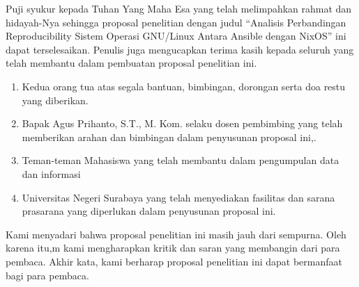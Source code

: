 \begin{justify}
	Puji syukur kepada Tuhan Yang Maha Esa yang telah melimpahkan rahmat dan hidayah-Nya sehingga proposal penelitian dengan judul “Analisis Perbandingan Reproducibility Sistem Operasi GNU/Linux Antara Ansible dengan NixOS” ini dapat terselesaikan. Penulis juga mengucapkan terima kasih kepada seluruh yang telah membantu dalam pembuatan proposal penelitian ini.
	\begin{enumerate}
		\item Kedua orang tua atas segala bantuan, bimbingan, dorongan serta doa restu yang diberikan.
		\item Bapak Agus Prihanto, S.T., M. Kom. selaku dosen pembimbing yang telah memberikan arahan dan bimbingan dalam penyusunan proposal ini,.
		\item Teman-teman Mahasiswa yang telah membantu dalam pengumpulan data dan informasi
		\item Universitas Negeri Surabaya yang telah menyediakan fasilitas dan sarana prasarana yang diperlukan dalam penyusunan proposal ini.
	\end{enumerate}
	Kami menyadari bahwa proposal penelitian ini masih jauh dari sempurna. Oleh karena itu,m kami mengharapkan kritik dan saran yang membangin dari para pembaca.
	Akhir kata, kami berharap proposal penelitian ini dapat bermanfaat bagi para pembaca.
\end{justify}
